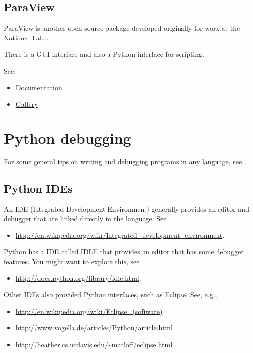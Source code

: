 \documentclass[letterpaper,10pt,english]{sphinxmanual}
\begin{document}
\subsection{ParaView}
\label{python_plotting:id4}\label{python_plotting:paraview}
ParaView is another open source package developed originally for work at the
National Labs.

There is a GUI interface and also a Python interface for scripting.

See:
\begin{itemize}
\item {} 
\href{http://www.paraview.org/paraview/help/documentation.html}{Documentation}

\item {} 
\href{http://www.paraview.org/paraview/project/imagegallery.php}{Gallery}

\end{itemize}


\section{Python debugging}
\label{python_debugging:python-debugging}\label{python_debugging::doc}\label{python_debugging:id1}
For some general tips on writing and debugging programs in any language, see
.


\subsection{Python IDEs}
\label{python_debugging:python-ides}
An IDE (Integrated Development Environment) generally provides an editor and
debugger that are linked directly to the language.   See
\begin{itemize}
\item {} 
\url{http://en.wikipedia.org/wiki/Integrated\_development\_environment}.

\end{itemize}

Python has a IDE called IDLE that
provides an editor that has some debugger features.  You might want to
explore this, see
\begin{itemize}
\item {} 
\url{http://docs.python.org/library/idle.html}.

\end{itemize}

Other IDEs also provided Python interfaces, such as Eclipse.
See, e.g.,
\begin{itemize}
\item {} 
\url{http://en.wikipedia.org/wiki/Eclipse\_(software)}

\item {} 
\url{http://www.vogella.de/articles/Python/article.html}

\item {} 
\url{http://heather.cs.ucdavis.edu/~matloff/eclipse.html}

\end{itemize}
\end{document}
